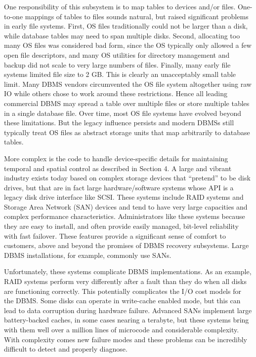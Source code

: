 \documentclass[b5paper,11pt,twoside,openright]{book}
\begin{document}
One responsibility of this subsystem is to map tables to devices and/or
files. One-to-one mappings of tables to files sounds natural, but raised
significant problems in early file systems. First, OS files
traditionally could not be larger than a disk, while database tables may
need to span multiple disks. Second, allocating too many OS files was
considered bad form, since the OS typically only allowed a few open file
descriptors, and many OS utilities for directory management and backup
did not scale to very large numbers of files. Finally, many early file
systems limited file size to 2 GB. This is clearly an unacceptably small
table limit. Many DBMS vendors circumvented the OS file system
altogether using raw IO while others chose to work around these
restrictions. Hence all leading commercial DBMS may spread a table over
multiple files or store multiple tables in a single database file. Over
time, most OS file systems have evolved beyond these limitations. But
the legacy influence persists and modern DBMSs still typically treat OS
files as abstract storage units that map arbitrarily to database tables.

More complex is the code to handle device-specific details for
maintaining temporal and spatial control as described in Section 4. A
large and vibrant industry exists today based on complex storage devices
that ``pretend'' to be disk drives, but that are in fact large
hardware/software systems whose API is a legacy disk drive interface
like SCSI. These systems include RAID systems and Storage Area Network
(SAN) devices and tend to have very large capacities and complex
performance characteristics. Administrators like these systems because
they are easy to install, and often provide easily managed, bit-level
reliability with fast failover. These features provide a significant
sense of comfort to customers, above and beyond the promises of DBMS
recovery subsystems. Large DBMS installations, for example, commonly use
SANs.

Unfortunately, these systems complicate DBMS implementations. As an
example, RAID systems perform very differently after a fault than they
do when all disks are functioning correctly. This potentially
complicates the I/O cost models for the DBMS. Some disks can operate in
write-cache enabled mode, but this can lead to data corruption during
hardware failure. Advanced SANs implement large battery-backed caches,
in some cases nearing a terabyte, but these systems bring with them well
over a million lines of microcode and considerable complexity. With
complexity comes new failure modes and these problems can be incredibly
difficult to detect and properly diagnose.
\end{document}
